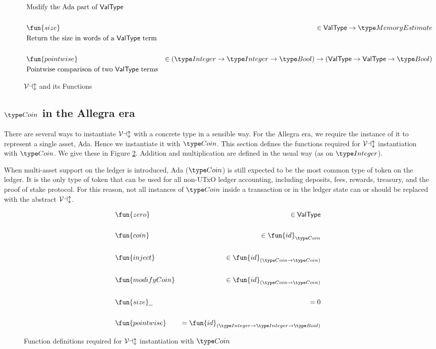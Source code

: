 \begin{figure}[htb]
\begin{align*}
      & \text{Modify the Ada part of $\mathsf{ValType}$}\\~\\
      & \fun{size} &\in \mathsf{ValType} \to \MemoryEstimate\\
      & \text{Return the size in words of a $\mathsf{ValType}$ term}\\~\\
      & \fun{pointwise} &\in (\Integer \to \Integer \to \Bool) \to (\mathsf{ValType} \to \mathsf{ValType} \to \Bool)\\
      & \text{Pointwise comparison of two $\mathsf{ValType}$ terms}
  \end{align*}
  \caption{$\mathcal{Val}$ and its Functions}
  \label{fig:valclass}
\end{figure}

\subsection{$\Coin$ in the Allegra era}

There are several ways to instantiate $\mathcal{Val}$ with a concrete type in a sensible way.
For the Allegra era, we require the instance of it to represent a single asset, Ada. Hence
we instantiate it with $\Coin$. This section defines the functions
required for $\mathcal{Val}$ instantiation with $\Coin$. We give these in Figure
\ref{fig:coin}. Addition and multiplication are defined in the usual way
(as on $\Integer$).

When multi-asset support on the ledger is introduced, Ada ($\Coin$) is still expected to be
the most common type of token on the ledger.
It is the only
type of token that can be used for all non-UTxO ledger accounting, including deposits,
fees, rewards, treasury, and the proof of stake protocol. For this reason, not
all instances of $\Coin$ inside a transaction or in the ledger state can or
should be replaced with the abstract $\mathcal{Val}$.

\begin{figure}[htb]
  \begin{align*}
      & \fun{zero} &\in \mathsf{ValType} \\~\\
      & \fun{coin} &\in \fun{id}_{\Coin}\\~\\
      & \fun{inject} &\in \fun{id}_{(\Coin \to \Coin)} \\~\\
      & \fun{modifyCoin} &\in \fun{id}_{(\Coin \to \Coin)} \\~\\
      & \fun{size} \wcard &= 0 \\~\\
      & \fun{pointwise} &= \fun{id}_{(\Integer \to \Integer \to \Bool)}
  \end{align*}
  \caption{Function definitions required for $\mathcal{Val}$ instantiation with $\Coin$}
  \label{fig:coin}
\end{figure}

